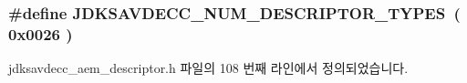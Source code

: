 \subsubsection[{\texorpdfstring{J\+D\+K\+S\+A\+V\+D\+E\+C\+C\+\_\+\+N\+U\+M\+\_\+\+D\+E\+S\+C\+R\+I\+P\+T\+O\+R\+\_\+\+T\+Y\+P\+ES}{JDKSAVDECC_NUM_DESCRIPTOR_TYPES}}]{\setlength{\rightskip}{0pt plus 5cm}\#define J\+D\+K\+S\+A\+V\+D\+E\+C\+C\+\_\+\+N\+U\+M\+\_\+\+D\+E\+S\+C\+R\+I\+P\+T\+O\+R\+\_\+\+T\+Y\+P\+ES~( 0x0026 )}\hypertarget{group__descriptor_gadfb8b289bbee62e041de59018b7ce3d3}{}\label{group__descriptor_gadfb8b289bbee62e041de59018b7ce3d3}


jdksavdecc\+\_\+aem\+\_\+descriptor.\+h 파일의 108 번째 라인에서 정의되었습니다.

